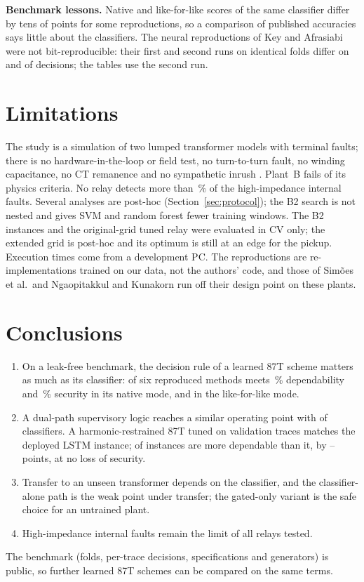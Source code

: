 \documentclass[preprint,12pt]{elsarticle}
\begin{document}
\textbf{Benchmark lessons.} Native and like-for-like scores of the same classifier differ by tens of points for some reproductions, so a comparison of published accuracies says little about the classifiers. The neural reproductions of Key and Afrasiabi were not bit-reproducible: their first and second runs on identical folds differ on \runDiffKey{} and \runDiffAfr{} of \runKeysKey{} decisions; the tables use the second run.

\section{Limitations}
\label{sec:limits}
The study is a simulation of two lumped transformer models with terminal faults; there is no hardware-in-the-loop or field test, no turn-to-turn fault, no winding capacitance, no CT remanence \citep{ieeec37110} and no sympathetic inrush \citep{bronzeado1995,rudez2016}. Plant~B fails \critBFail{} of its \critBN{} physics criteria. No relay detects more than \hizInstHi\,\% of the high-impedance internal faults. Several analyses are post-hoc (Section~\ref{sec:protocol}); the B2 search is not nested and gives SVM and random forest fewer training windows. The B2 instances and the original-grid tuned relay were evaluated in CV only; the extended grid is post-hoc and its optimum is still at an edge for the pickup. Execution times come from a development PC. The reproductions are re-implementations trained on our data, not the authors' code, and those of Sim\~oes et al.\ and Ngaopitakkul and Kunakorn run off their design point on these plants.

\section{Conclusions}
\label{sec:conclusion}
\begin{enumerate}
\item On a leak-free benchmark, the decision rule of a learned 87T scheme matters as much as its classifier: \nNatMeet{} of six reproduced methods meets \critDep\,\% dependability and \critSec\,\% security in its native mode, and \nLflMeet{} in the like-for-like mode.
\item A dual-path supervisory logic reaches a similar operating point with \nClsGood{} of \nClsAll{} classifiers. A harmonic-restrained 87T tuned on validation traces matches the deployed LSTM instance; \kSigX{} of \nInst{} instances are more dependable than it, by \aGainX--\bGainX{} points, at no loss of security.
\item Transfer to an unseen transformer depends on the classifier, and the classifier-alone path is the weak point under transfer; the gated-only variant is the safe choice for an untrained plant.
\item High-impedance internal faults remain the limit of all relays tested.
\end{enumerate}
The benchmark (folds, per-trace decisions, specifications and generators) is public, so further learned 87T schemes can be compared on the same terms.
\end{document}
